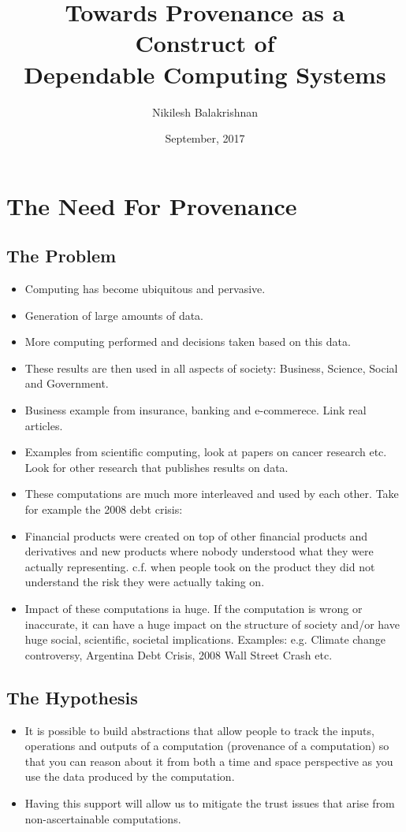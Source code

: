 \documentclass[withindex,glossary]{cam-thesis}
\title{Towards Provenance as a Construct of \\
Dependable Computing Systems}
\author{Nikilesh Balakrishnan}
\date{September, 2017}
\begin{document}
\frontmatter{}



\chapter{The Need For Provenance}

\section{The Problem}
\begin{itemize}
\item Computing has become ubiquitous and pervasive.
\item Generation of large amounts of data.
\item More computing performed and decisions taken based on this data.
\item These results are then used in all aspects of society: Business, Science, Social and Government.
\item Business example from insurance, banking and e-commerece. Link real articles.
\item Examples from scientific computing, look at papers on cancer research etc. Look for other research that publishes results on data.
\item These computations are much more interleaved and used by each other. Take for example the 2008 debt crisis:
\item Financial products were created on top of other financial products and derivatives and new products where nobody understood
what they were actually representing. c.f. when people took on the product they did not understand the risk they were actually taking on.
\item Impact of these computations ia huge. If the computation is wrong or inaccurate, it can have a huge impact on the structure of
society and/or have huge social, scientific, societal implications. Examples: e.g. Climate change controversy, Argentina Debt Crisis,
2008 Wall Street Crash etc.
\end{itemize}

\section{The Hypothesis}
\begin{itemize}
\item It is possible to build abstractions that allow people to track the inputs, operations and outputs of a computation
(provenance of a computation) so that you can reason about it from both a time and space perspective as you use the data
produced by the computation.
\item Having this support will allow us to mitigate the trust issues that arise from non-ascertainable computations.
\end{itemize}
\end{document}
